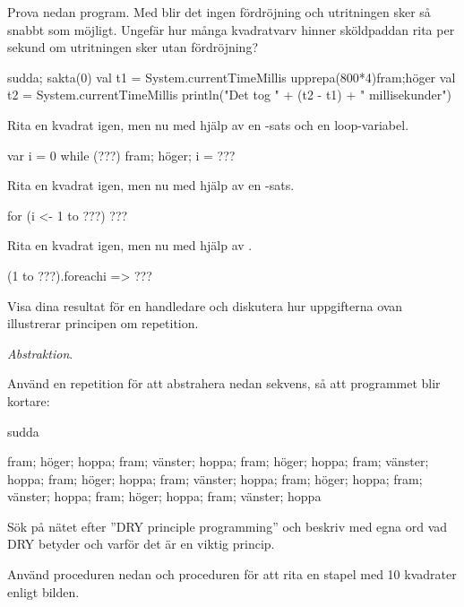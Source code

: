 \Subtask Prova nedan program. Med  blir det ingen fördröjning och utritningen sker så snabbt som möjligt. Ungefär hur många kvadratvarv hinner sköldpaddan rita per sekund om utritningen sker utan fördröjning? 
\begin{Code}
sudda; sakta(0)
val t1 = System.currentTimeMillis
upprepa(800*4){fram;höger}
val t2 = System.currentTimeMillis
println("Det tog " + (t2 - t1) + " millisekunder")
\end{Code}



\Subtask Rita en kvadrat igen, men nu med hjälp av en -sats och en loop-variabel.

\begin{Code}
var i = 0
while (???) {fram; höger; i = ???}
\end{Code}

\Subtask Rita en kvadrat igen, men nu med hjälp av en -sats.

\begin{Code}
for (i <- 1 to ???) {???}
\end{Code}

\Subtask Rita en kvadrat igen, men nu med hjälp av .

\begin{Code}
(1 to ???).foreach{i => ???}
\end{Code}

\Subtask\Checkpoint Visa dina resultat för en handledare och diskutera hur uppgifterna ovan illustrerar principen om repetition.
 


\Task \textit{Abstraktion}.

\Subtask Använd en repetition för att abstrahera nedan sekvens, så att programmet blir kortare:
\begin{Code}
sudda

fram; höger; hoppa; fram; vänster; hoppa; fram; höger;
hoppa; fram; vänster; hoppa; fram; höger; hoppa; fram;
vänster; hoppa; fram; höger; hoppa; fram; vänster; hoppa;
fram; höger; hoppa; fram; vänster; hoppa
\end{Code}

\Subtask\Pen Sök på nätet efter ''DRY principle programming'' och beskriv med egna ord vad DRY betyder och varför det är en viktig princip.

\Subtask Använd proceduren  nedan och proceduren  för att rita en stapel med 10 kvadrater enligt bilden.

